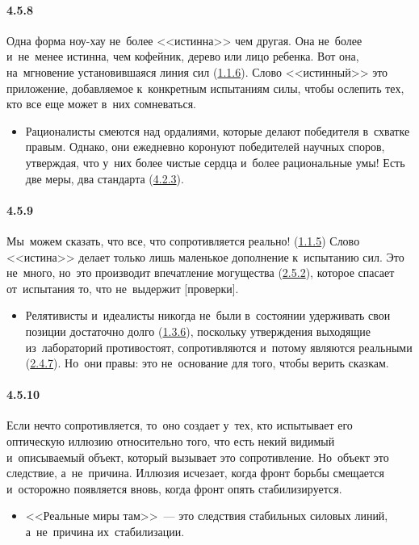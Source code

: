 \paragraph{4.5.8}\hypertarget{par:4.5.8}{} Одна форма ноу-хау не~более <<истинна>> чем другая. Она не~более и~не~менее истинна, чем кофейник, дерево или лицо ребенка. Вот она, на~мгновение установившаяся линия сил (\hyperlink{par:1.1.6}{1.1.6}). Слово <<истинный>> это приложение, добавляемое к~конкретным испытаниям силы, чтобы ослепить тех, кто все еще может в~них сомневаться. 
	\begin{itemize}
	\item 
	Рационалисты смеются над ордалиями, которые делают победителя в~схватке правым. Однако, они ежедневно коронуют победителей научных споров, утверждая, что у~них более чистые сердца и~более рациональные умы! Есть две меры, два стандарта (\hyperlink{par:4.2.3}{4.2.3}).
	\end{itemize}	


\paragraph{4.5.9}\hypertarget{par:4.5.9}{} Мы~можем сказать, что все, что сопротивляется реально! (\hyperlink{par:1.1.5}{1.1.5}) Слово <<истина>> делает только лишь маленькое дополнение к~испытанию сил. Это не~много, но~это производит впечатление могущества (\hyperlink{par:2.5.2}{2.5.2}), которое спасает от~испытания то, что не~выдержит [проверки]. 
	\begin{itemize}
	\item 
	Релятивисты и~идеалисты никогда не~были в~состоянии удерживать свои позиции достаточно долго (\hyperlink{par:1.3.6}{1.3.6}), поскольку утверждения выходящие из~лабораторий противостоят, сопротивляются и~потому являются реальными (\hyperlink{par:2.4.7}{2.4.7}). Но~они правы: это не~основание для того, чтобы верить сказкам.
	\end{itemize}	

\paragraph{4.5.10}\hypertarget{par:4.5.10}{}Если нечто сопротивляется, то~оно создает у~тех, кто испытывает его оптическую иллюзию относительно того, что есть некий видимый и~описываемый объект, который вызывает это сопротивление. Но~объект это следствие, а~не~причина. Иллюзия исчезает, когда фронт борьбы смещается и~осторожно появляется вновь, когда фронт опять стабилизируется. 
	\begin{itemize}
	\item 
	<<Реальные миры там>>~--- это следствия стабильных силовых линий, а~не~причина их~стабилизации.
	\end{itemize}	

